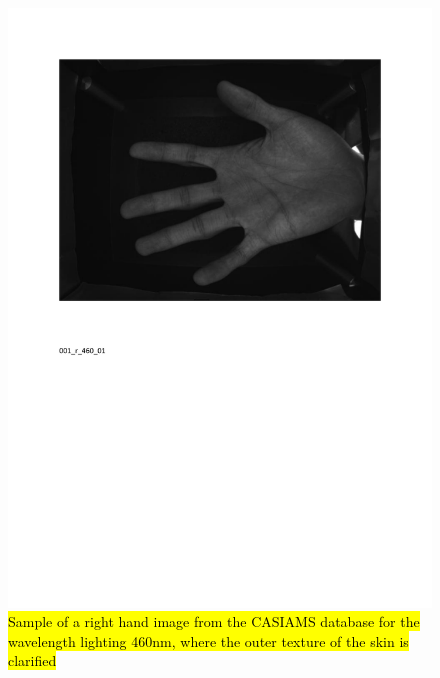 \documentclass[review]{elsarticle}
\begin{document}
	\begin{figure}[!t]
		\centering
		\includegraphics[page=1,scale=.57,trim=1cm 14.7cm 1cm 1.7cm,clip]{CASIA_multi_spectral_samples.pdf}
		\caption{\hl{Sample of a right hand image from the CASIAMS database for the wavelength lighting 460nm, where the outer texture of the skin is clarified}}
		\label{fig:CASIA_460nm_lighting}
	\end{figure}
\end{document}
